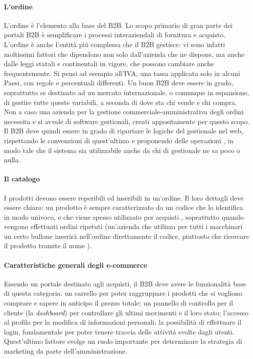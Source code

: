 \paragraph{L'ordine}
L'ordine è l'elemento alla base del B2B. Lo scopo primario di gran parte dei portali B2B è semplificare i processi interaziendali di fornitura e acquisto. L'ordine è anche l'entità più complessa che il B2B gestisce: vi sono infatti moltissimi fattori che dipendono non solo dall'azienda che ne dispone, ma anche dalle leggi statali e continentali in vigore, che possono cambiare anche frequentemente. Si pensi ad esempio all'\Gls{IVA}, una tassa applicata solo in alcuni Paesi, con regole e percentuali differenti. Un buon B2B deve essere in grado, soprattutto se destinato ad un mercato internazionale, o comunque in espansione, di gestire tutte queste variabili, a seconda di dove sta chi vende e chi compra. Non a caso una azienda per la gestione commerciale-amministrativa degli ordini necessita e si avvale di software gestionali, creati appositamente per questo scopo. Il B2B deve quindi essere in grado di riportare le logiche del gestionale nel web, rispettando le convenzioni di quest'ultimo e proponendo delle operazioni , in modo tale che il sistema sia utilizzabile anche da chi di gestionale ne sa poco o nulla.

\paragraph{Il catalogo}
I prodotti devono essere reperibili ed inseribili in un'ordine. Il loro dettagli deve essere chiaro: un prodotto è sempre caratterizzato da un codice che lo identifica in modo univoco, e che viene spesso utilizzato per acquisti , soprattutto quando vengono effettuati ordini ripetuti (un'azienda che utilizza per tutti i macchinari un certo bullone inserirà nell'ordine direttamente il codice, piuttosto che ricercare il prodotto tramite il nome ).

\paragraph{Caratteristiche generali degli e-commerce}
Essendo un portale destinato agli acquisti, il B2B deve avere le funzionalità base di questa categoria: un carrello per poter raggruppare i prodotti che si vogliono comprare e sapere in anticipo il prezzo totale; un pannello di controllo per il cliente (la \textit{dashboard}) per controllare gli ultimi movimenti e il loro stato; l'accesso al profilo per la modifica di informazioni personali; la possibilità di effettuare il login, fondamentale per poter tenere traccia delle attività svolte dagli utenti. Quest'ultimo fattore svolge un ruolo importante per determinare la strategia di marketing da parte dell'amministrazione.

